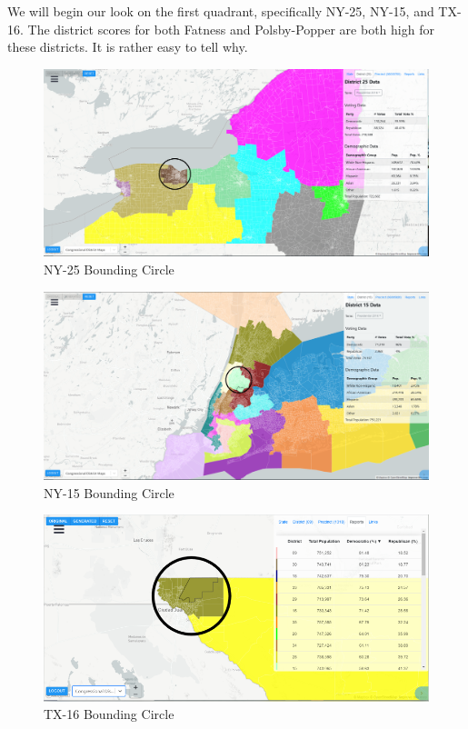 \documentclass[letterpaper]{article}
\begin{document}
We will begin our look on the first quadrant, specifically NY-25, NY-15, and TX-16. The district scores for both Fatness and Polsby-Popper are both high for these districts. It is rather easy to tell why.

\begin{figure}[H]
	\includegraphics[width=\linewidth]{./figures/NY-25-BoundingCircle.png}
	\caption{NY-25 Bounding Circle}
	\label{fig:ny25boundingCircle}
\end{figure}

\begin{figure}[H]
	\includegraphics[width=\linewidth]{./figures/NY-15-BoundingCircle.png}
	\caption{NY-15 Bounding Circle}
	\label{fig:ny15boundingCircle}
\end{figure}

\begin{figure}[H]
	\includegraphics[width=\linewidth]{./figures/TX-16-BoundingCircle.png}
	\caption{TX-16 Bounding Circle}
	\label{fig:tx16boundingCircle}
\end{figure}
\end{document}
